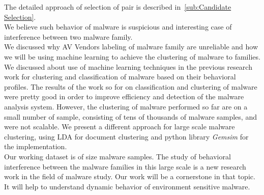 The detailed approach of selection of pair is described in~\autoref{sub:Candidate Selection}.\\
We believe such behavior of malware is suspicious and interesting case of interference between two malware family.\\
We discussed why AV Vendors labeling of malware family are unreliable and how we will be using machine learning to achieve the clustering of malware to families.
We discussed about use of machine learning techniques in the previous research work for clustering and classification of malware based on their behavioral profiles.
The results of the work so for on classification and clustering of malware were pretty good in order to improve efficiency and detection of the malware analysis system.
However, the clustering of malware performed so far are on a small number of sample, consisting of tens of thousands of malware samples, and were not scalable.
We present a different approach for large scale malware clustering, using LDA for document clustering and python library \emph{Gemsim} for the implementation.\\
Our working dataset is of size {\gettotalmalwarei{}} malware samples.
The study of behavioral interference between the malware families in this large scale is a new research work in the field of malware study.
Our work will be a cornerstone in that topic.
It will help to understand dynamic behavior of environment sensitive malware.
